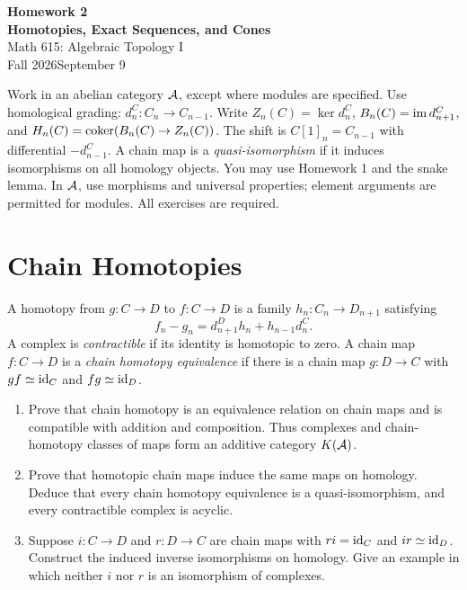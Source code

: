 \documentclass[11pt]{article}
\newcommand{\coursetitle}[3]{\begin{center}{\large\bfseries\color{teal}#1}\\[4pt]{\LARGE\bfseries\color{teal}#2}\\[6pt]Math 615: Algebraic Topology I\\Fall 2026\quad\textbar\quad #3\end{center}}
\begin{document}
\coursetitle{Homework 2}{Homotopies, Exact Sequences, and Cones}{September 9}
Work in an abelian category $\mathcal A$, except where modules are specified. Use homological grading:
$d^C_n:C_n\to C_{n-1}$. Write $Z_n(C)=\ker d^C_n$,
$B_n(C)=\operatorname{im} d^C_{n+1}$, and $H_n(C)=\operatorname{coker}(B_n(C)\to Z_n(C))$.
The shift is $C[1]_n=C_{n-1}$ with differential $-d^C_{n-1}$.
A chain map is a \emph{quasi-isomorphism} if it induces isomorphisms on all homology objects.
You may use Homework 1 and the snake lemma. In $\mathcal A$, use morphisms and universal properties; element arguments are permitted for modules. All exercises are required.

\section{Chain Homotopies}\label{ex:homotopy}
A homotopy from $g:C\to D$ to $f:C\to D$ is a family $h_n:C_n\to D_{n+1}$ satisfying
\[
f_n-g_n=d^D_{n+1}h_n+h_{n-1}d^C_n.
\]
A complex is \emph{contractible} if its identity is homotopic to zero.
A chain map $f:C\to D$ is a \emph{chain homotopy equivalence} if there is a chain map $g:D\to C$ with $gf\simeq\mathrm{id}_C$ and $fg\simeq\mathrm{id}_D$.
\begin{enumerate}
\item Prove that chain homotopy is an equivalence relation on chain maps and is compatible with addition and composition. Thus complexes and chain-homotopy classes of maps form an additive category $K(\mathcal A)$.
\item Prove that homotopic chain maps induce the same maps on homology. Deduce that every chain homotopy equivalence is a quasi-isomorphism, and every contractible complex is acyclic.
\item Suppose $i:C\to D$ and $r:D\to C$ are chain maps with $ri=\mathrm{id}_C$ and $ir\simeq\mathrm{id}_D$. Construct the induced inverse isomorphisms on homology. Give an example in which neither $i$ nor $r$ is an isomorphism of complexes.
\end{enumerate}
\end{document}
